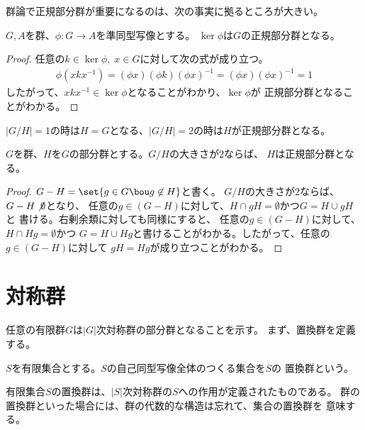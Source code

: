 	群論で正規部分群が重要になるのは、次の事実に拠るところが大きい。

	\begin{proposition}[正規部分群と準同型の核]
	\label{prop:正規部分群と準同型の核} %
		$G,A$を群、$\phi:G\to A$を準同型写像とする。
		$\ker\phi$は$G$の正規部分群となる。
	\end{proposition} %
	\begin{proof} 任意の$k\in\ker\phi,\;x\in G$に対して次の式が成り立つ。
		\begin{equation*}\begin{split} %
			\phi(xkx^{-1}) = (\phi x)(\phi k)(\phi x)^{-1}
			= (\phi x)(\phi x)^{-1}
			= 1
		\end{split}\end{equation*} %
		したがって、$xkx^{-1}\in\ker\phi$となることがわかり、$\ker\phi$が
		正規部分群となることがわかる。
	\end{proof}

	$|G/H|=1$の時は$H=G$となる、$|G/H|=2$の時は$H$が正規部分群となる。

	\begin{proposition}[大きさが二の商集合]\label{prop:大きさが二の商集合} %
		$G$を群、$H$を$G$の部分群とする。$G/H$の大きさが$2$ならば、
		$H$は正規部分群となる。
	\end{proposition} %
	\begin{proof} $G-H=\set{g\in G\bou g\not\in H}$と書く。
		$G/H$の大きさが$2$ならば、$G-H\not\emptyset$となり、
		任意の$g\in(G-H)$に対して、$H\cap gH=\emptyset$かつ$G=H\cup gH$と
		書ける。右剰余類に対しても同様にすると、
		任意の$g\in(G-H)$に対して、$H\cap Hg=\emptyset$かつ
		$G=H\cup Hg$と書けることがわかる。したがって、任意の$g\in(G-H)$に対して
		$gH=Hg$が成り立つことがわかる。
	\end{proof}
\section{対称群}\label{s1:対称群} %
	任意の有限群$G$は$|G|$次対称群の部分群となることを示す。
	まず、置換群を定義する。

	\begin{definition}[置換群]\label{def:置換群} %
		$S$を有限集合とする。$S$の自己同型写像全体のつくる集合を$S$の
		置換群という。
	\end{definition} %

	有限集合$S$の置換群は、$|S|$次対称群の$S$への作用が定義されたものである。
	群の置換群といった場合には、群の代数的な構造は忘れて、集合の置換群を
	意味する。


